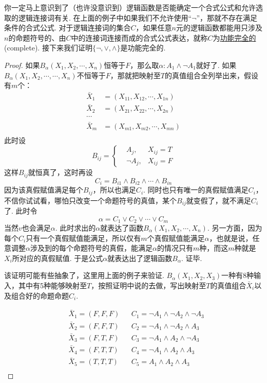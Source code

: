 \documentclass[main.tex]{subfiles}
\begin{document}
你一定马上意识到了（也许没意识到）逻辑函数是否能确定一个合式公式和允许选取的逻辑连接词有关. 在上面的例子中如果我们不允许使用“\(\neg\)”，那就不存在满足条件的合式公式. 对于逻辑连接词的集合\(C\)，如果任意\(n\)元的逻辑函数都能用只涉及\(n\)的命题符号的、由\(C\)中的连接词连接而成的合式公式表达，就称\(C\)为\uline{功能完全的}(complete). 接下来我们证明\(\{\neg, \vee, \wedge\}\)是功能完全的.

\begin{proof}
    如果\(B_\alpha(X_1, X_2, \cdots, X_n)\)恒等于\(F\)，那么取\(\alpha: A_1 \wedge \neg A_1\)就好了. \newline
    如果\(B_\alpha(X_1, X_2, \cdots, \cdots, X_n)\)不恒等于\(F\)，那就把映射至\(T\)的真值组合全列举出来，假设有\(m\)个：
    \begin{align*}
        \bar{X}_1 &= (X_{11}, X_{12}, \cdots, X_{1n}) \\
        \bar{X}_2 &= (X_{21}, X_{22}, \cdots, X_{2n}) \\
        \cdots &\\
        \bar{X}_m &= (X_{m1}, X_{m2}, \cdots, X_{mn}) \\
    \end{align*}
    此时设\[B_{ij} = \left\{ \begin{aligned} &A_{j}, &X_{ij} = T \\ &\neg A_j, &X_{ij} = F \end{aligned} \right.\]
    这样\(B_{ij}\)就恒真了，这时再设
    \[C_i = B_{i1} \wedge B_{i2} \wedge \cdots \wedge B_{in}\]
    因为该真假赋值满足每个\(B_{ij}\)，所以也满足\(C_i\). 同时也只有唯一的真假赋值满足\(C_i\)，不信你试试看，哪怕只改变一个命题符号的真值，某个\(B_{ij}\)就变假了，就不满足\(C_i\)了. 此时令
    \[\alpha = C_1 \vee C_2 \vee \cdots \vee C_m\]
    当然\(v\)也会满足\(\alpha\). 此时求出的\(\alpha\)就表达了函数\(B_\alpha(X_1, X_2, \cdots, X_n)\). 另一方面，因为每个\(C_i\)只有一个真假赋值能满足，所以仅有\(m\)个真假赋值能满足\(\alpha\)，也就是说，任意调整\(\alpha\)涉及到的每个命题符号的真假，能满足\(\alpha\)的情况只有\(m\)种，而这\(m\)种就是\(X_i\)所对应的真假赋值. 于是公式\(\alpha\)就表达出了逻辑函数\(B_\alpha\). 证毕.

    该证明可能有些抽象了，这里用上面的例子来验证. \(B_\alpha(X_1, X_2, X_3)\)一种有8种输入，其中有5种能够映射至\(T\)，按照证明中说的去做，写出映射至\(T\)的真值组合\(\bar{X}_i\)以及组合好的命题命题\(C_i\).
    
    \begin{align*}
        &\bar{X}_1 = (F,F,F) && C_1 = \neg A_1 \wedge \neg A_2 \wedge \neg A_3 \\
        &\bar{X}_2 = (F,F,T) && C_2 = \neg A_1 \wedge \neg A_2 \wedge A_3 \\
        &\bar{X}_3 = (F,T,F) && C_3 = \neg A_1 \wedge A_2 \wedge \neg A_3 \\
        &\bar{X}_4 = (F,T,T) && C_4 = \neg A_1 \wedge A_2 \wedge A_3 \\
        &\bar{X}_5 = (T,T,T) && C_5 = A_1 \wedge A_2 \wedge A_3 \\
    \end{align*}


\end{proof}
\end{document}
